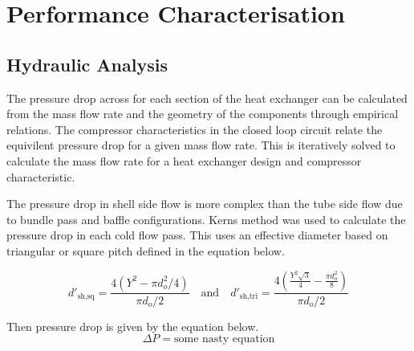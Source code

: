 \documentclass{article}
\begin{document}

\section{Performance Characterisation}

\subsection{Hydraulic Analysis}

The pressure drop across for each section of the heat exchanger can be calculated from the mass flow rate and the geometry of the components through empirical relations.
The compressor characteristics in the closed loop circuit relate the equivilent pressure drop for a given mass flow rate.
This is iteratively solved to calculate the mass flow rate for a heat exchanger design and compressor characteristic.

The pressure drop in shell side flow is more complex than the tube side flow due to bundle pass and baffle configurations.
Kerns method was used to calculate the pressure drop in each cold flow pass.
This uses an effective diameter based on triangular or square pitch defined in the equation below.

\begin{equation}
  d'_{\text{sh,sq}} = \frac{4(Y^2 - \pi d_o^2/4)}{\pi d_o / 2}  \quad \text{and} \quad d'_{\text{sh,tri}} = \frac{4(\frac{Y^2 \sqrt{3}}{4} - \frac{\pi d_o^2}{8})}{\pi d_o / 2}
\end{equation}

Then pressure drop is given by the equation below.
\begin{equation}
  \Delta P = \text{some nasty equation}
\end{equation}

\end{document}
